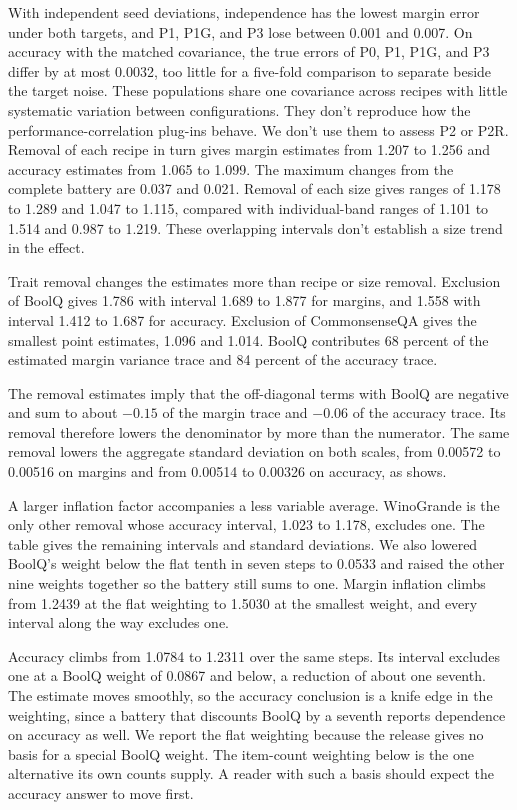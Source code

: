 With independent seed deviations, independence has the lowest margin error under both targets, and P1, P1G, and P3 lose between 0.001 and 0.007. On accuracy with the matched covariance, the true errors of P0, P1, P1G, and P3 differ by at most 0.0032, too little for a five-fold comparison to separate beside the target noise. These populations share one covariance across recipes with little systematic variation between configurations. They don't reproduce how the performance-correlation plug-ins behave. We don't use them to assess P2 or P2R.
Removal of each recipe in turn gives margin estimates from 1.207 to 1.256 and accuracy estimates from 1.065 to 1.099. The maximum changes from the complete battery are 0.037 and 0.021. Removal of each size gives ranges of 1.178 to 1.289 and 1.047 to 1.115, compared with individual-band ranges of 1.101 to 1.514 and 0.987 to 1.219. These overlapping intervals don't establish a size trend in the effect.

Trait removal changes the estimates more than recipe or size removal. Exclusion of BoolQ gives 1.786 with interval 1.689 to 1.877 for margins, and 1.558 with interval 1.412 to 1.687 for accuracy. Exclusion of CommonsenseQA gives the smallest point estimates, 1.096 and 1.014. BoolQ contributes 68 percent of the estimated margin variance trace and 84 percent of the accuracy trace.

The removal estimates imply that the off-diagonal terms with BoolQ are negative and sum to about $-0.15$ of the margin trace and $-0.06$ of the accuracy trace. Its removal therefore lowers the denominator by more than the numerator. The same removal lowers the aggregate standard deviation on both scales, from 0.00572 to 0.00516 on margins and from 0.00514 to 0.00326 on accuracy, as  shows.

A larger inflation factor accompanies a less variable average. WinoGrande is the only other removal whose accuracy interval, 1.023 to 1.178, excludes one. The table gives the remaining intervals and standard deviations. We also lowered BoolQ's weight below the flat tenth in seven steps to 0.0533 and raised the other nine weights together so the battery still sums to one. Margin inflation climbs from 1.2439 at the flat weighting to 1.5030 at the smallest weight, and every interval along the way excludes one.

Accuracy climbs from 1.0784 to 1.2311 over the same steps. Its interval excludes one at a BoolQ weight of 0.0867 and below, a reduction of about one seventh. The estimate moves smoothly, so the accuracy conclusion is a knife edge in the weighting, since a battery that discounts BoolQ by a seventh reports dependence on accuracy as well. We report the flat weighting because the release gives no basis for a special BoolQ weight. The item-count weighting below is the one alternative its own counts supply. A reader with such a basis should expect the accuracy answer to move first.

